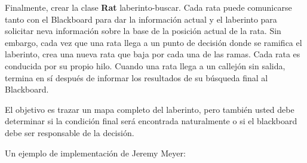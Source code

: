 \documentclass{article}
\begin{document}
Finalmente, crear la clase \textbf{Rat} laberinto-buscar. Cada rata puede comunicarse tanto con el Blackboard para dar la información actual y el laberinto para solicitar neva información sobre la base de la posición actual de la rata. Sin embargo, cada vez que una rata llega a un punto de decisión donde se ramifica el laberinto, crea una nueva rata que baja por cada una de las ramas. Cada rata es conducida por su propio hilo.   Cuando una rata llega a un callejón sin salida, termina en sí después de informar los resultados de su búsqueda final al Blackboard.\newline

El objetivo es trazar un mapa completo del laberinto, pero también usted debe determinar si la condición final será encontrada naturalmente o si el blackboard debe ser responsable de la decisión. \newline

Un ejemplo de implementación de Jeremy Meyer:    \newline
\end{document}
